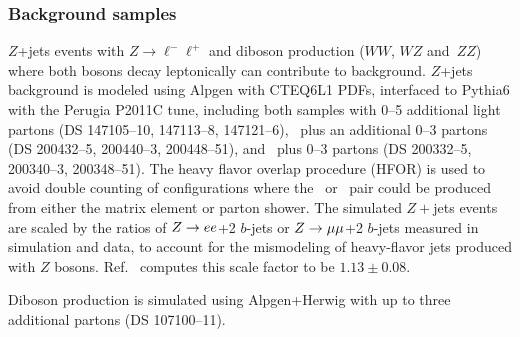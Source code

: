 \subsubsection{Background samples}\label{ss:mcbkg}

$Z$+jets events with $Z\rightarrow \ell^-\ell^+$ and diboson production ($WW$, $WZ$ and~$ZZ$) where both bosons decay leptonically can contribute to background. $Z$+jets background is modeled using {\textsc  Alpgen} \cite{Mangano:2002ea} with CTEQ6L1 PDFs, interfaced to {\textsc  Pythia6} with the Perugia P2011C tune, including both samples with 0--5 additional light partons (DS 147105--10, 147113--8, 147121--6), 
\ccbar\ plus an additional 0--3 partons (DS 200432--5, 200440--3, 200448--51), and \bbbar\
plus 0--3 partons (DS 200332--5, 200340--3, 200348--51). The heavy flavor overlap procedure (HFOR) \cite{hfor} is used to avoid double counting of configurations where the \ccbar\ or \bbbar\ pair could be produced from either the matrix element or parton shower. The simulated $Z+$jets  events are scaled by the ratios of $Z\rightarrow ee$+2 $b$-jets or $Z\rightarrow \mu\mu$+2 $b$-jets measured in simulation and data, to account for the mismodeling of heavy-flavor jets produced with $Z$ bosons. Ref.~\cite{xsec} computes this scale factor to be $1.13 \pm 0.08$. 

Diboson production is simulated using {\textsc  Alpgen+Herwig} with up to three additional partons (DS 107100--11).


